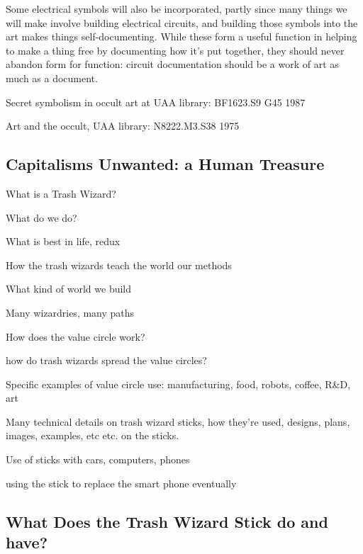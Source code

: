 Some electrical symbols will also be incorporated, partly since many
things we will make involve building electrical circuits, and building
those symbols into the art makes things self-documenting. While these
form a useful function in helping to make a thing free by documenting
how it's put together, they should never abandon form for function:
circuit documentation should be a work of art as much as a document.

Secret symbolism in occult art at UAA library: BF1623.S9 G45 1987

Art and the occult, UAA library: N8222.M3.S38 1975

\subsection{Capitalisms Unwanted: a Human
Treasure}\label{capitalisms-unwanted-a-human-treasure}

What is a Trash Wizard?

What do we do?

What is best in life, redux

How the trash wizards teach the world our methods

What kind of world we build

Many wizardries, many paths

How does the value circle work?

how do trash wizards spread the value circles?

Specific examples of value circle use: manufacturing, food, robots,
coffee, R\&D, art

Many technical details on trash wizard sticks, how they're used,
designs, plans, images, examples, etc etc. on the sticks.

Use of sticks with cars, computers, phones

using the stick to replace the smart phone eventually

\subsection{What Does the Trash Wizard Stick do and
have?}\label{what-does-the-trash-wizard-stick-do-and-have}

